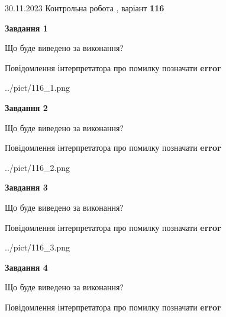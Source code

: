 \documentclass[12pt, ukrainian]{article}
\begin{document}
{{30.11.2023 Контрольна робота , варіант  \No \textbf { 116 }\par}}
{




{\begin {center}\textbf{Завдання 1}\end {center}}\par
Що буде виведено за виконання? \par
Повідомлення інтерпретатора про помилку позначати \textbf{error}

\begin{center}
	{../pict/116_1.png}
\end{center}
\newpage

{\begin {center}\textbf{Завдання 2}\end {center}}\par
Що буде виведено за виконання? \par
Повідомлення інтерпретатора про помилку позначати \textbf{error}

\begin{center}
	{../pict/116_2.png}
\end{center}
\newpage

{\begin {center}\textbf{Завдання 3}\end {center}}\par
Що буде виведено за виконання? \par
Повідомлення інтерпретатора про помилку позначати \textbf{error}

\begin{center}
	{../pict/116_3.png}
\end{center}
\newpage

{\begin {center}\textbf{Завдання 4}\end {center}}\par
Що буде виведено за виконання? \par
Повідомлення інтерпретатора про помилку позначати \textbf{error}

}
\end{document}
